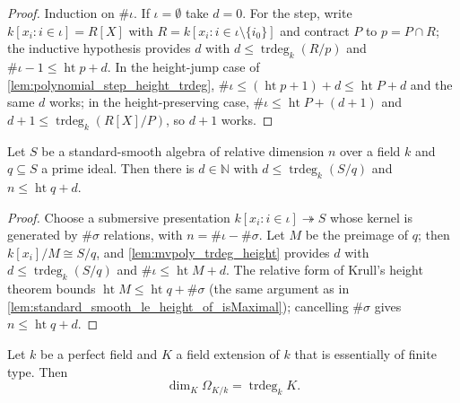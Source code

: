 \begin{proof}
  \leanok
  Induction on \(\#\iota\). If \(\iota = \emptyset\) take \(d = 0\). For the
  step, write \(k[x_i : i \in \iota] = R[X]\) with
  \(R = k[x_i : i \in \iota\setminus\{i_0\}]\) and contract \(P\) to
  \(p = P \cap R\); the inductive hypothesis provides \(d\) with
  \(d \le \operatorname{trdeg}_k (R/p)\) and \(\#\iota - 1 \le
  \operatorname{ht} p + d\). In the height-jump case of
  \cref{lem:polynomial_step_height_trdeg},
  \(\#\iota \le (\operatorname{ht} p + 1) + d \le \operatorname{ht} P + d\)
  and the same \(d\) works; in the height-preserving case,
  \(\#\iota \le \operatorname{ht} P + (d+1)\) and
  \(d + 1 \le \operatorname{trdeg}_k (R[X]/P)\), so \(d+1\) works.
\end{proof}

\begin{lemma}
  \label{lem:standard_smooth_trdeg_height}
  Let \(S\) be a standard-smooth algebra of relative dimension \(n\) over a
  field \(k\) and \(q \subseteq S\) a prime ideal. Then there is
  \(d \in \mathbb N\) with \(d \le \operatorname{trdeg}_k (S/q)\) and
  \(n \le \operatorname{ht} q + d\).
\end{lemma}

\begin{proof}
  \leanok
  Choose a submersive presentation \(k[x_i : i \in \iota] \twoheadrightarrow S\)
  whose kernel is generated by \(\#\sigma\) relations, with
  \(n = \#\iota - \#\sigma\). Let \(M\) be the preimage of \(q\); then
  \(k[x_i]/M \cong S/q\), and \cref{lem:mvpoly_trdeg_height} provides \(d\)
  with \(d \le \operatorname{trdeg}_k (S/q)\) and
  \(\#\iota \le \operatorname{ht} M + d\). The relative form of Krull's height
  theorem bounds \(\operatorname{ht} M \le \operatorname{ht} q + \#\sigma\)
  (the same argument as in \cref{lem:standard_smooth_le_height_of_isMaximal});
  cancelling \(\#\sigma\) gives \(n \le \operatorname{ht} q + d\).
\end{proof}

\begin{lemma}
  \label{lem:kaehler_rank_eq_trdeg}
  Let \(k\) be a perfect field and \(K\) a field extension of \(k\) that is
  essentially of finite type. Then
  \[\dim_K \Omega_{K/k} = \operatorname{trdeg}_k K.\]
\end{lemma}

